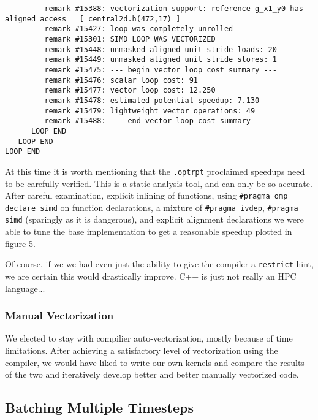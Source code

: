 {\begin{lstlisting}
         remark #15388: vectorization support: reference g_x1_y0 has aligned access   [ central2d.h(472,17) ]
         remark #15427: loop was completely unrolled
         remark #15301: SIMD LOOP WAS VECTORIZED
         remark #15448: unmasked aligned unit stride loads: 20 
         remark #15449: unmasked aligned unit stride stores: 1 
         remark #15475: --- begin vector loop cost summary ---
         remark #15476: scalar loop cost: 91 
         remark #15477: vector loop cost: 12.250 
         remark #15478: estimated potential speedup: 7.130 
         remark #15479: lightweight vector operations: 49 
         remark #15488: --- end vector loop cost summary ---
      LOOP END
   LOOP END
LOOP END
\end{lstlisting}
}

\noindent At this time it is worth mentioning that the \texttt{.optrpt} proclaimed speedups need to be carefully verified.  This is a static analysis tool, and can only be so accurate.  After careful examination, explicit inlining of functions, using \texttt{\#pragma omp declare simd} on function declarations, a mixture of \texttt{\#pragma ivdep}, \texttt{\#pragma simd} (sparingly as it is dangerous), and explicit alignment declarations we were able to tune the base implementation to get a reasonable speedup plotted in figure 5.



\noindent Of course, if we we had even just the ability to give the compiler a \texttt{restrict} hint, we are certain this would drastically improve.  C++ is just not really an HPC language...

\subsubsection{Manual Vectorization}
\label{sec-tune-vectorizing-manual-vectorization}

We elected to stay with compilier auto-vectorization, mostly because of time limitations.  After achieving a satisfactory level of vectorization
using the compiler, we would have liked to write our own kernels and compare the results of the two and iteratively develop better and better
manually vectorized code.

\subsection{Batching Multiple Timesteps}
\label{sec-tune-batching}

